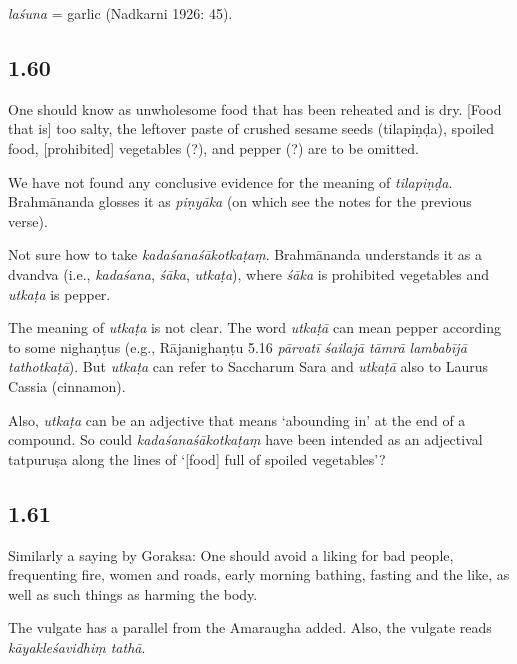 \begin{ekdosis}
\begin{philcomm}[hp01_059]
\emph{laśuna} = garlic (Nadkarni 1926: 45).
\end{philcomm}

\subsection*{1.60}
\begin{translation}[hp01_060]
One should know as unwholesome food that has been reheated and is dry. [Food that is] too salty, the leftover paste of crushed sesame seeds (tilapiṇḍa), spoiled food, [prohibited] vegetables (?), and pepper (?) are to be omitted. 
\end{translation}

\begin{philcomm}[hp01_060]
We have not found any conclusive evidence for the meaning of \emph{tilapiṇḍa}. Brahmānanda glosses it as \emph{piṇyāka} (on which see the notes for the previous verse). 

Not sure how to take \emph{kadaśanaśākotkaṭaṃ}. Brahmānanda understands it as a dvandva (i.e., \emph{kadaśana}, \emph{śāka}, \emph{utkaṭa}), where \emph{śāka} is prohibited vegetables and \emph{utkaṭa} is pepper. 

The meaning of \emph{utkaṭa} is not clear. The word \emph{utkaṭā} can mean pepper according to some nighaṇṭus (e.g., Rājanighaṇṭu 5.16 \emph{pārvatī śailajā tāmrā lambabījā tathotkaṭā}). But \emph{utkaṭa} can refer to Saccharum Sara and \emph{utkaṭā} also to Laurus Cassia (cinnamon). 

Also, \emph{utkaṭa} can be an adjective that means ‘abounding in’ at the end of a compound. So could \emph{kadaśanaśākotkaṭaṃ} have been intended as an adjectival tatpuruṣa along the lines of ‘[food] full of spoiled vegetables’?
\end{philcomm}

\subsection*{1.61}
\begin{translation}[hp01_061]
Similarly a saying by Goraksa:
One should avoid a liking for bad people, frequenting fire, women and roads, early morning bathing, fasting and the like, as well as such things as harming the body.
\end{translation}

\begin{philcomm}[hp01_061]
The vulgate has a parallel from the Amaraugha added. Also, the vulgate reads \emph{kāyakleśavidhiṃ tathā}.
\end{philcomm}


\end{ekdosis}
